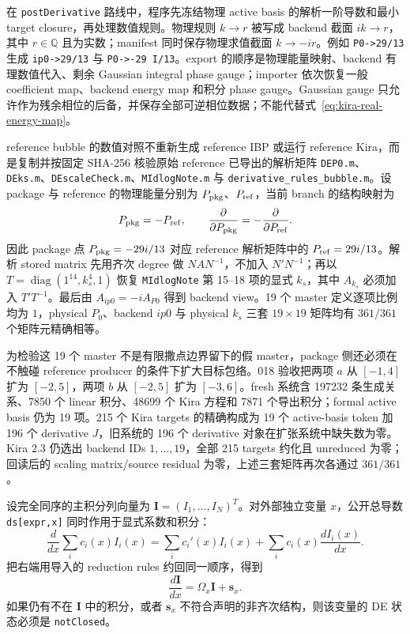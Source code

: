﻿\documentclass[a4paper,11pt]{article}
\begin{document}
在 \texttt{postDerivative} 路线中，程序先冻结物理 active basis 的解析一阶导数和最小 target closure，再处理数值规则。物理规则 $k\to r$ 被写成 backend 截面 $ik\to r$，其中 $r\in\mathbb Q$ 且为实数；manifest 同时保存物理求值截面 $k\to-ir$。例如 \texttt{P0->29/13} 生成 \texttt{ip0->29/13} 与 \texttt{P0->-29 I/13}。export 的顺序是物理能量映射、backend 有理数值代入、剩余 Gaussian integral phase gauge；importer 依次恢复一般 coefficient map、backend energy map 和积分 phase gauge。Gaussian gauge 只允许作为残余相位的后备，并保存全部可逆相位数据；不能代替式~\eqref{eq:kira-real-energy-map}。

reference bubble 的数值对照不重新生成 reference IBP 或运行 reference Kira，而是复制并按固定 SHA-256 核验原始 reference 已导出的解析矩阵 \texttt{DEP0.m}、\texttt{DEks.m}、\texttt{DEscaleCheck.m}、\texttt{MIdlogNote.m} 与 \texttt{derivative\_rules\_bubble.m}。设 package 与 reference 的物理能量分别为 $P_{\rm pkg}$、$P_{\rm ref}$，当前 branch 的结构映射为
\begin{equation}
 P_{\rm pkg}=-P_{\rm ref},\qquad
 \frac{\partial}{\partial P_{\rm pkg}}=-\frac{\partial}{\partial P_{\rm ref}}.
\end{equation}
因此 package 点 $P_{\rm pkg}=-29i/13$ 对应 reference 解析矩阵中的 $P_{\rm ref}=29i/13$。解析 stored matrix 先用齐次 degree 做 $N A N^{-1}$，不加入 $N'N^{-1}$；再以 $T=\operatorname{diag}(1^{14},k_s^4,1)$ 恢复 \texttt{MIdlogNote} 第 15--18 项的显式 $k_s$，其中 $A_{k_s}$ 必须加入 $T'T^{-1}$。最后由 $A_{ip0}=-iA_{P0}$ 得到 backend view。19 个 master 定义逐项比例均为 $1$，physical $P_0$、backend $ip0$ 与 physical $k_s$ 三套 $19\times19$ 矩阵均有 $361/361$ 个矩阵元精确相等。

为检验这 19 个 master 不是有限撒点边界留下的假 master，package 侧还必须在不触碰 reference producer 的条件下扩大目标包络。018 验收把两项 $a$ 从 $[-1,4]$ 扩为 $[-2,5]$，两项 $b$ 从 $[-2,5]$ 扩为 $[-3,6]$。fresh 系统含 197232 条生成关系、7850 个 linear 积分、48699 个 Kira 方程和 7871 个导出积分；formal active basis 仍为 19 项。215 个 Kira targets 的精确构成为 19 个 active-basis token 加 196 个 derivative $J$，旧系统的 196 个 derivative 对象在扩张系统中缺失数为零。Kira 2.3 仍选出 backend IDs $1,\ldots,19$，全部 215 targets 约化且 unreduced 为零；回读后的 scaling matrix/source residual 为零，上述三套矩阵再次各通过 $361/361$。

设完全同序的主积分列向量为 $\bm I=(I_1,\ldots,I_N)^T$。对外部独立变量 $x$，公开总导数 \texttt{ds[expr,x]} 同时作用于显式系数和积分：
\begin{equation}
 \frac{d}{dx}\sum_i c_i(x)I_i(x)
 =\sum_i c_i'(x)I_i(x)+\sum_i c_i(x)\frac{dI_i(x)}{dx}.
\end{equation}
把右端用导入的 reduction rules 约回同一顺序，得到
\begin{equation}
 \frac{d\bm I}{dx}=\Omega_x\bm I+\bm s_x.
\end{equation}
如果仍有不在 $\bm I$ 中的积分，或者 $\bm s_x$ 不符合声明的非齐次结构，则该变量的 DE 状态必须是 \texttt{notClosed}。
\end{document}
